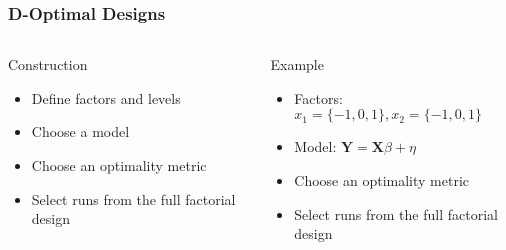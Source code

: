 \documentclass[10pt, compress, aspectratio=169, xcolor={table,usenames,dvipsnames}]{beamer}
\begin{document}
\begin{frame}
    \frametitle{D-Optimal Designs}
    \begin{columns}[c]
            \begin{block}{Construction}
                \begin{itemize}
                    \item Define \alert{factors and levels}
                    \item Choose a \alert{model}
                    \item Choose an \alert{optimality metric}
                    \item \alert{Select} runs from the \alert{full factorial
                        design}
                \end{itemize}
            \end{block}

            \begin{block}{Example}
                \begin{itemize}
                    \item Factors: $x_1 = \{-1, 0, 1\}, x_2 = \{-1, 0, 1\}$
                    \item Model: $\mathbf{Y} = \mathbf{X}\beta + \eta$
                    \item Choose an \alert{optimality metric}
                    \item \alert{Select} runs from the \alert{full factorial
                        design}
                \end{itemize}
            \end{block}

    \end{columns}
\end{frame}
\end{document}
